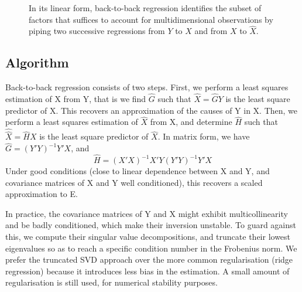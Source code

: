 \documentclass{article}
\begin{document}
\begin{figure}[t!]
    \caption{In its linear form, back-to-back regression identifies the subset of factors that suffices to account for multidimensional observations by piping two successive regressions from $Y$ to $X$ and from $X$ to $\hat X$. }
    \label{fig:}
\end{figure}


\subsection{Algorithm}

Back-to-back regression consists of two steps.
%
First, we perform a least squares estimation of X from Y, that is we find $\hat G$ such that $\hat X=\hat G Y$ is the least square predictor of X.
%
This recovers an approximation of the causes of Y in X.
%
Then, we perform a least squares estimation of $\hat X$ from X, and determine $\hat H$ such that $\hat {\hat X}=\hat H X$ is the least square predictor of $\hat X$.
%
In matrix form, we have $\hat G=(Y'Y)^{-1} Y'X$, and
\begin{equation} \hat H=(X'X)^{-1} X'Y(Y'Y)^{-1} Y'X\end{equation}
Under good conditions (close to linear dependence between X and Y, and covariance matrices of X and Y well conditioned), this recovers a scaled approximation to E.

In practice, the covariance matrices of Y and X might exhibit multicollinearity and be badly conditioned, which make their inversion unstable. To guard against this, we compute their singular value decompositions, and truncate their lowest eigenvalues so as to reach a specific condition number in the Frobenius norm. We prefer the truncated SVD approach over the more common regularisation (ridge regression) because it introduces less bias in the estimation. A small amount of regularisation is still used, for numerical stability purposes.
\end{document}

